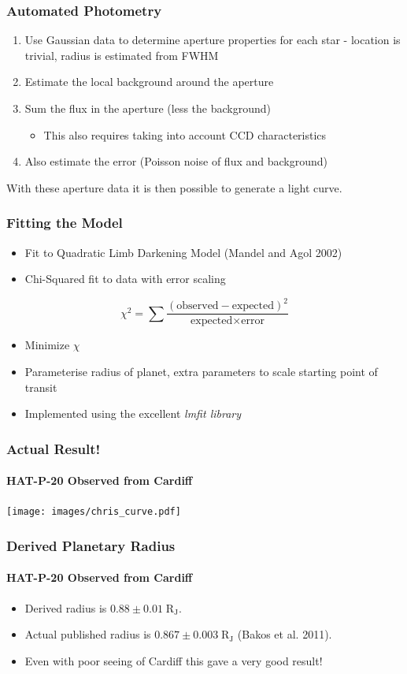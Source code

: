 \documentclass{beamer}
\providecommand{\units}[1]{\;\mathrm{#1}}
\providecommand{\RJ}{\ensuremath{\units{R_J}}}
\begin{document}
  \begin{frame}
  \frametitle{Automated Photometry}
  \begin{enumerate}
  \item Use Gaussian data to determine aperture properties for each star - location is trivial, radius is estimated from FWHM
  \item Estimate the local background around the aperture
  \item Sum the flux in the aperture (less the background)
  \begin{itemize}
    \item This also requires taking into account CCD characteristics
  \end{itemize}
  \item Also estimate the error (Poisson noise of flux and background)
  \end{enumerate}
  With these aperture data it is then possible to generate a light curve.
  \end{frame}
   \begin{frame}
    \frametitle{Fitting the Model}
    \begin{itemize}
      \item Fit to Quadratic Limb Darkening Model (Mandel and Agol 2002)
      \item Chi-Squared fit to data with error scaling
    \end{itemize}
    \[ \chi^2 = \sum \frac{(\text{observed}-\text{expected})^2}{\text{expected} \times \text{error}} \]
    \begin{itemize}
      \item Minimize $\chi$
      \item Parameterise radius of planet, extra parameters to scale starting point of transit
      \item Implemented using the excellent \em{lmfit} library
    \end{itemize}
  \end{frame}
  \begin{frame}
  \frametitle{Actual Result!}
  \framesubtitle{HAT-P-20 Observed from Cardiff}
  \begin{center}
        \texttt{[image: images/chris\_curve.pdf]}
  \end{center}
  \end{frame}
  \begin{frame}
    \frametitle{Derived Planetary Radius}
    \framesubtitle{HAT-P-20 Observed from Cardiff}
    \begin{itemize}
    \item Derived radius is $0.88\pm0.01\RJ$.
    \item Actual published radius is $0.867\pm0.003\RJ$ (Bakos et al. 2011).
    \item Even with poor seeing of Cardiff this gave a very good result!
    \end{itemize}
  \end{frame}
\end{document}

